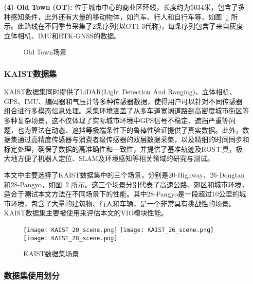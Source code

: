 \textbf{(4) Old Town (OT):} 位于城市中心的商业区环线，长度约为5034米，包含了多种感知条件，此外还有大量的移动物体，如汽车、行人和自行车等，如图~\ref{fig:OT_data} 所示。此路线在不同季节采集了2条序列(以OT1-3代称)，每条序列包含了来自灰度立体相机、IMU和RTK-GNSS的数据。

\begin{figure}
  \centering
  \caption{Old Town场景}
  \label{fig:OT_data}
\end{figure}

\subsubsection{KAIST数据集}
KAIST数据集\cite{jjeong-2019-ijrr}同时提供了LiDAR(Light Detection And Ranging)、立体相机、GPS、IMU、编码器和气压计等多种传感器数据，使得用户可以针对不同传感器组合进行多模态信息处理。采集环境涵盖了从多车道宽阔道路到高密度城市街区等多种复杂场景，这不仅体现了实际城市环境中GPS信号不稳定、遮挡严重等问题，也为算法在动态、遮挡等极端条件下的鲁棒性验证提供了真实数据。此外，数据集通过高精度传感器与消费者级传感器的双层数据采集，以及精细的时间同步和标定处理，确保了数据的高准确性和一致性，并提供了基准轨迹及ROS工具，极大地方便了机器人定位、SLAM及环境感知等相关领域的研究与测试。

本文中主要选择了KAIST数据集中的三个场景，分别是20-Highway、26-Dongtan和28-Pangyo，如图~\ref{fig:KAIST_data} 所示。这三个场景分别代表了高速公路、郊区和城市环境，适合于测试本文方法在不同场景下的性能。其中28-Pangyo是一段超过10公里的城市环境，包含了大量的建筑物、行人和车辆，是一个非常具有挑战性的场景。KAIST数据集主要被使用来评估本文的VIO模块性能。

\begin{figure}
  \centering
  \texttt{[image: KAIST\_20\_scene.png]}
  \texttt{[image: KAIST\_26\_scene.png]}
  \texttt{[image: KAIST\_28\_scene.png]}
  \caption{KAIST数据集场景}
  \label{fig:KAIST_data}
\end{figure}

\subsubsection{数据集使用划分}

